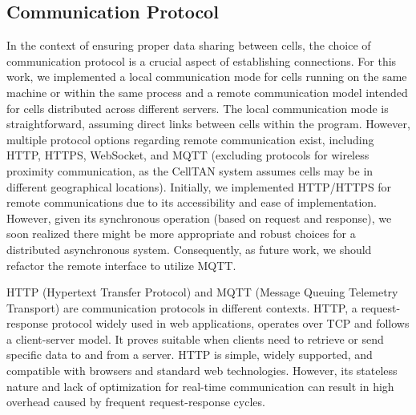 \subsection{Communication Protocol}

In the context of ensuring proper data sharing between cells, the choice of communication protocol is a crucial aspect of establishing connections. For this work, we implemented a local communication mode for cells running on the same machine or within the same process and a remote communication model intended for cells distributed across different servers. The local communication mode is straightforward, assuming direct links between cells within the program. However, multiple protocol options regarding remote communication exist, including HTTP, HTTPS, WebSocket, and MQTT (excluding protocols for wireless proximity communication, as the CellTAN system assumes cells may be in different geographical locations). Initially, we implemented HTTP/HTTPS for remote communications due to its accessibility and ease of implementation. However, given its synchronous operation (based on request and response), we soon realized there might be more appropriate and robust choices for a distributed asynchronous system. Consequently, as future work, we should refactor the remote interface to utilize MQTT.

HTTP (Hypertext Transfer Protocol) and MQTT (Message Queuing Telemetry Transport) are communication protocols in different contexts. HTTP, a request-response protocol widely used in web applications, operates over TCP and follows a client-server model. It proves suitable when clients need to retrieve or send specific data to and from a server. HTTP is simple, widely supported, and compatible with browsers and standard web technologies. However, its stateless nature and lack of optimization for real-time communication can result in high overhead caused by frequent request-response cycles.



